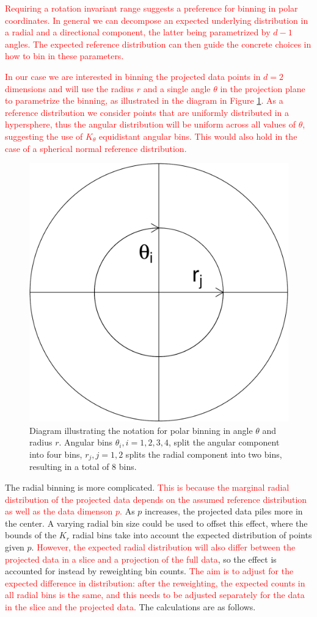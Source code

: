 \documentclass[]{interact}
\theoremstyle{plain}%
\theoremstyle{definition}
\theoremstyle{remark}
\begin{document}
\textcolor{red}{Requiring a rotation invariant range suggests a preference for binning in polar coordinates. In general we can decompose an expected underlying distribution in a radial and a directional component, the latter being parametrized by $d-1$ angles. The expected reference distribution can then guide the concrete choices in how to bin in these parameters.}

\textcolor{red}{In our case we are interested in binning the projected data points in $d=2$ dimensions and will use the radius $r$ and a single angle $\theta$ in the projection plane to parametrize the binning, as illustrated in the diagram in Figure \ref{fig:sketch}. As a reference distribution we consider points that are uniformly distributed in a hypersphere, thus the angular distribution will be uniform across all values of $\theta$, suggesting the use of $K_{\theta}$ equidistant angular bins. This would also hold in the case of a spherical normal reference distribution.}

\begin{figure}

{\centering \includegraphics[width=0.3\linewidth]{section_pursuit_files/figure-latex/sketch-1} 

}

\caption{Diagram illustrating the notation for polar binning in angle $\theta$ and radius $r$. Angular bins $\theta_i, i=1, 2, 3, 4$, split the angular component into four bins, $r_j, j=1, 2$ splits the radial component into two bins, resulting in a total of 8 bins.}\label{fig:sketch}
\end{figure}

The radial binning is more complicated.
\textcolor{red}{This is because the marginal radial distribution of the projected data depends on the assumed reference distribution as well as the data dimenson $p$.}
As \(p\) increases, the projected data piles more in the center. A
varying radial bin size could be used to offset this effect, where the
bounds of the \(K_r\) radial bins take into account the expected
distribution of points given \(p\).
\textcolor{red}{However, the expected radial distribution will also differ between the projected data in a slice and a projection of the full data},
so the effect is accounted for instead by reweighting bin counts.
\textcolor{red}{The aim is to adjust for the expected difference in distribution: after the reweighting, the expected counts in all radial bins is the same, and this needs to be adjusted separately for the data in the slice and the projected data.}
The calculations are as follows.
\end{document}
